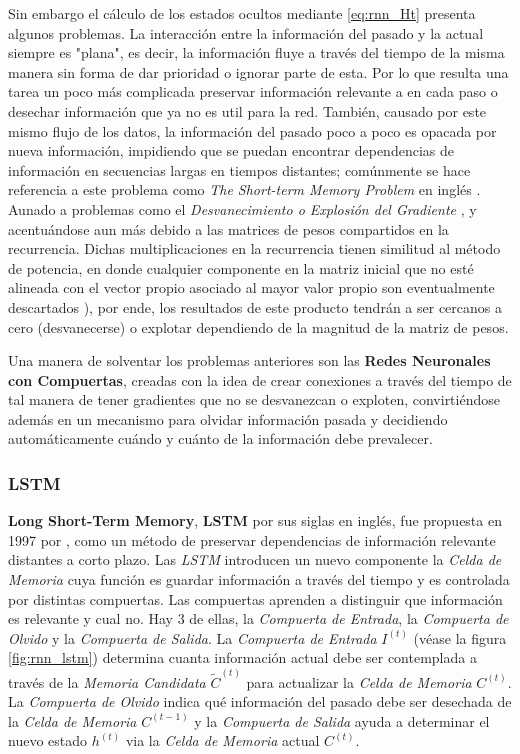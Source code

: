 Sin embargo el cálculo de los estados ocultos mediante \ref{eq:rnn_Ht} presenta algunos problemas.
La interacción entre la información del pasado y la actual siempre es "plana", es decir, la información
fluye a través del tiempo de la misma manera sin forma de dar prioridad o ignorar parte de
esta. Por lo que resulta una tarea un poco más complicada preservar información relevante a en cada paso
o desechar información que ya no es util para la red. También, causado por este mismo flujo de los
datos, la información del pasado poco a poco es opacada por nueva información, impidiendo que se
puedan encontrar dependencias de información en secuencias largas en tiempos distantes;
comúnmente se hace referencia a este problema como \textit{The Short-term Memory Problem} en inglés
\cite{VanishinGradient2}.
Aunado a problemas como el
\textit{Desvanecimiento o Explosión del Gradiente} \cite{VanishinGradient} \cite{pmlr-v28-pascanu13},
y acentuándose aun más
debido a las matrices de pesos compartidos en la recurrencia. Dichas
multiplicaciones en la recurrencia tienen similitud al método de potencia, en donde cualquier
componente en la matriz inicial que no esté alineada con el vector propio asociado al mayor valor
propio son eventualmente descartados \cite[pp.~390-392]{GoodBengCour16}), por ende, los resultados
de este producto tendrán a ser cercanos a cero (desvanecerse) o explotar dependiendo de la magnitud
de la matriz de pesos.

Una manera de solventar los problemas anteriores son las \textbf{Redes Neuronales con Compuertas},
creadas con la idea de crear conexiones a través del tiempo de tal manera de tener gradientes que no
se desvanezcan o exploten, convirtiéndose además en un mecanismo para olvidar información pasada y
decidiendo automáticamente cuándo y cuánto de la información debe prevalecer.

\subsubsection{LSTM}

\textbf{Long Short-Term Memory}, \textbf{LSTM} por sus siglas en inglés, fue propuesta en 1997 por
\citeauthor{LSTM}, como un método de preservar dependencias de información relevante
distantes a corto plazo. Las \textit{LSTM} introducen un nuevo componente la
\textit{Celda de Memoria} cuya función es guardar información a través del tiempo y es
controlada por distintas compuertas. Las compuertas aprenden a distinguir que información es relevante y
cual no. Hay 3 de ellas, la \textit{Compuerta de Entrada}, la \textit{Compuerta de Olvido}
y la \textit{Compuerta de Salida}. La \textit{Compuerta de Entrada} $I^{(t)}$ (véase la figura
\ref{fig:rnn_lstm}) determina cuanta información actual debe ser contemplada a través de la
\textit{Memoria Candidata} $\tilde C^{(t)}$ para actualizar la \textit{Celda de Memoria} $C^{(t)}$.
La \textit{Compuerta de Olvido} indica qué información del pasado debe ser desechada de la
\textit{Celda de Memoria} $C^{(t-1)}$ y la \textit{Compuerta de Salida} ayuda a determinar el nuevo
estado $h^{(t)}$ via la \textit{Celda de Memoria} actual $C^{(t)}$.

